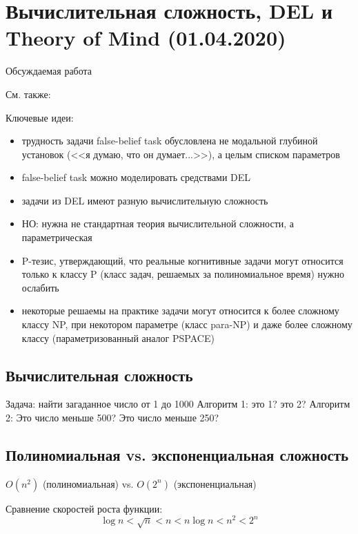 \section{Вычислительная сложность, DEL и Theory of Mind (01.04.2020)}

\begin{description}
\item[Обсуждаемая работа]\autocite{VandePol2018}
\item[См. также:] \autocite{2009,Rubio-Fernandez2013a,Szymanik2018TractabilityMind}
\end{description}


Ключевые идеи:
\begin{itemize}
\item трудность задачи false-belief task обусловлена не модальной глубиной установок (<<я думаю, что он думает...>>), а целым списком параметров 
\item  false-belief task можно моделировать средствами DEL
\item  задачи из DEL имеют разную вычислительную сложность
\item НО: нужна не стандартная теория вычислительной сложности, а параметрическая
\item P-тезис, утверждающий, что реальные когнитивные задачи могут относится только к классу P (класс задач, решаемых за полиномиальное время) нужно ослабить
\item некоторые решаемы на практике задачи могут относится к более сложному классу NP, при некотором параметре (класс para-NP) и даже более сложному классу (параметризованный аналог PSPACE)
\end{itemize}

\subsection{Вычислительная сложность}
Задача: найти загаданное число от 1 до 1000
Алгоритм 1: это 1? это 2?
Алгоритм 2: Это число меньше 500? Это число меньше 250?

\subsection{Полиномиальная vs. экспоненциальная сложность}
$O(n^2)$ (полиномиальная) vs. $O(2^n)$ (экспоненциальная)

Сравнение скоростей роста функции:
\begin{equation}
    \log  n < \sqrt{n} < n < n  \log  n < n^2 < 2^n
\end{equation}


